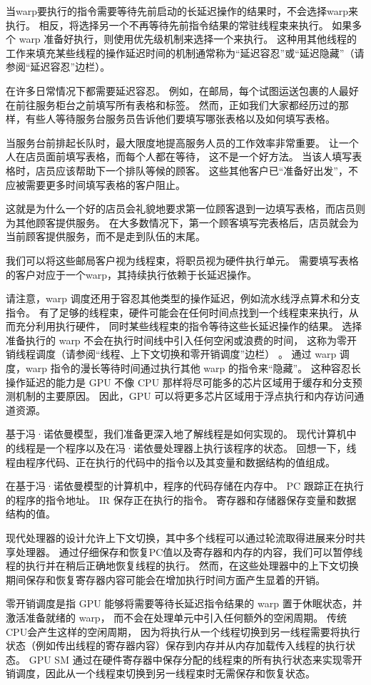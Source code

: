 当warp要执行的指令需要等待先前启动的长延迟操作的结果时，不会选择warp来执行。 
相反，将选择另一个不再等待先前指令结果的常驻线程束来执行。 如果多个 warp 准备好执行，则使用优先级机制来选择一个来执行。 
这种用其他线程的工作来填充某些线程的操作延迟时间的机制通常称为“延迟容忍”或“延迟隐藏”（请参阅“延迟容忍”边栏）。

\begin{remark}[延迟容忍]
在许多日常情况下都需要延迟容忍。 例如，在邮局，每个试图运送包裹的人最好在前往服务柜台之前填写所有表格和标签。 
然而，正如我们大家都经历过的那样，有些人等待服务台服务员告诉他们要填写哪张表格以及如何填写表格。

当服务台前排起长队时，最大限度地提高服务人员的工作效率非常重要。 让一个人在店员面前填写表格，而每个人都在等待，
这不是一个好方法。 当该人填写表格时，店员应该帮助下一个排队等候的顾客。 
这些其他客户已“准备好出发”，不应被需要更多时间填写表格的客户阻止。

这就是为什么一个好的店员会礼貌地要求第一位顾客退到一边填写表格，而店员则为其他顾客提供服务。 
在大多数情况下，第一个顾客填写完表格后，店员就会为当前顾客提供服务，而不是走到队伍的末尾。

我们可以将这些邮局客户视为线程束，将职员视为硬件执行单元。 
需要填写表格的客户对应于一个warp，其持续执行依赖于长延迟操作。
\end{remark}

请注意，warp 调度还用于容忍其他类型的操作延迟，例如流水线浮点算术和分支指令。 
有了足够的线程束，硬件可能会在任何时间点找到一个线程束来执行，从而充分利用执行硬件，
同时某些线程束的指令等待这些长延迟操作的结果。 选择准备执行的 warp 不会在执行时间线中引入任何空闲或浪费的时间，
这称为零开销线程调度（请参阅“线程、上下文切换和零开销调度”边栏） 。 
通过 warp 调度，warp 指令的漫长等待时间通过执行其他 warp 的指令来“隐藏”。 
这种容忍长操作延迟的能力是 GPU 不像 CPU 那样将尽可能多的芯片区域用于缓存和分支预测机制的主要原因。 
因此，GPU 可以将更多芯片区域用于浮点执行和内存访问通道资源。

\begin{remark}[线程、上下文切换和零开销调度]
基于冯·诺依曼模型，我们准备更深入地了解线程是如何实现的。 
现代计算机中的线程是一个程序以及在冯·诺依曼处理器上执行该程序的状态。 
回想一下，线程由程序代码、正在执行的代码中的指令以及其变量和数据结构的值组成。

在基于冯·诺依曼模型的计算机中，程序的代码存储在内存中。 PC 跟踪正在执行的程序的指令地址。 
IR 保存正在执行的指令。 寄存器和存储器保存变量和数据结构的值。

现代处理器的设计允许上下文切换，其中多个线程可以通过轮流取得进展来分时共享处理器。 
通过仔细保存和恢复PC值以及寄存器和内存的内容，我们可以暂停线程的执行并在稍后正确地恢复线程的执行。 
然而，在这些处理器中的上下文切换期间保存和恢复寄存器内容可能会在增加执行时间方面产生显着的开销。

零开销调度是指 GPU 能够将需要等待长延迟指令结果的 warp 置于休眠状态，并激活准备就绪的 warp，
而不会在处理单元中引入任何额外的空闲周期。 传统CPU会产生这样的空闲周期，
因为将执行从一个线程切换到另一线程需要将执行状态（例如传出线程的寄存器内容）保存到内存并从内存加载传入线程的执行状态。 
GPU SM 通过在硬件寄存器中保存分配的线程束的所有执行状态来实现零开销调度，因此从一个线程束切换到另一线程束时无需保存和恢复状态。
\end{remark}

